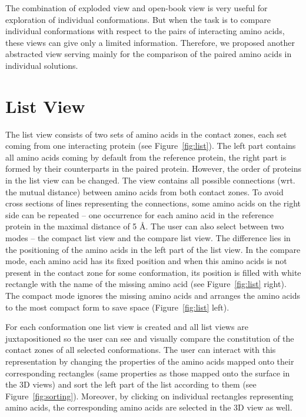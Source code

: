 \documentclass[journal]{vgtc}                %
\begin{document}
The combination of exploded view and open-book view is very useful for exploration of individual conformations.
But when the task is to compare individual conformations with respect to the pairs of interacting amino acids, these views can give only a limited information.
Therefore, we proposed another abstracted view serving mainly for the comparison of the paired amino acids in individual solutions.

\section{List View}
The list view consists of two sets of amino acids in the contact zones, each set coming from one interacting protein (see Figure~\ref{fig:list}).
The left part contains all amino acids coming by default from the reference protein, the right part is formed by their counterparts in the paired protein.
However, the order of proteins in the list view can be changed.
The view contains all possible connections (wrt. the mutual distance) between amino acids from both contact zones.
To avoid cross sections of lines representing the connections, some amino acids on the right side can be repeated -- one occurrence for each amino acid in the reference protein in the maximal distance of 5 \AA. 
The user can also select between two modes -- the compact list view and the compare list view.
The difference lies in the positioning of the amino acids in the left part of the list view. 
In the compare mode, each amino acid has its fixed position and when this amino acids is not present in the contact zone for some conformation, its position is filled with white rectangle with the name of the missing amino acid (see Figure~\ref{fig:list} right).
The compact mode ignores the missing amino acids and arranges the amino acids to the most compact form to save space (Figure~\ref{fig:list} left).
 
For each conformation one list view is created and all list views are juxtapositioned so the user can see and visually compare the constitution of the contact zones of all selected conformations.
The user can interact with this representation by changing the properties of the amino acids mapped onto their corresponding rectangles (same properties as those mapped onto the surface in the 3D views) and sort the left part of the list according to them (see Figure~\ref{fig:sorting}).
Moreover, by clicking on individual rectangles representing amino acids, the corresponding amino acids are selected in the 3D view as well.
\end{document}
